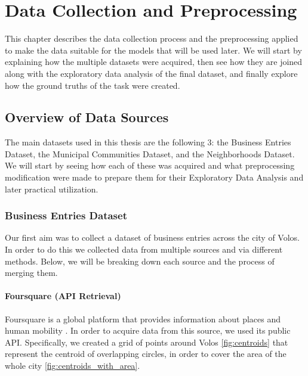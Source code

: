 \chapter{Data Collection and Preprocessing}
\label{chap3}

This chapter describes the data collection process and the preprocessing applied to make the data suitable for the models that will be used later. We will start by explaining how the multiple datasets were acquired, then see how they are joined along with the exploratory data analysis of the final dataset, and finally explore how the ground truths of the task were created.

\section{Overview of Data Sources}

The main datasets used in this thesis are the following 3: the Business Entries Dataset, the Municipal Communities Dataset, and the Neighborhoods Dataset. We will start by seeing how each of these was acquired and what preprocessing modification were made to prepare them for their Exploratory Data Analysis and later practical utilization.


\subsection{Business Entries Dataset}

Our first aim was to collect a dataset of business entries across the city of Volos. In order to do this we collected data from multiple sources and via different methods. Below, we will be breaking down each source and the process of merging them.


\subsubsection{Foursquare (API Retrieval)}

Foursquare is a global platform that provides information about places and human mobility \cite{foursquare}. In order to acquire data from this source, we used its public API. Specifically, we created a grid of points around Volos \ref{fig:centroids} that represent the centroid of overlapping circles, in order to cover the area of the whole city \ref{fig:centroids_with_area}. 

